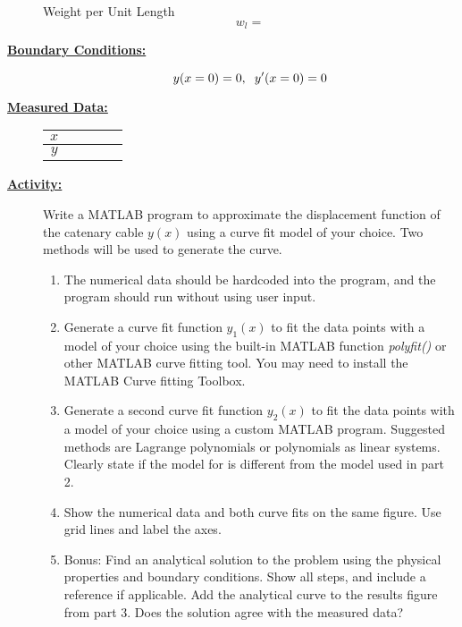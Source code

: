 \documentclass[12pt]{article}
\begin{document}
\begin{description}
  Weight per Unit Length
 	\[w_l = \]

  \item[\textbf{\underline{Boundary Conditions:}}] \hfill \vspace{0mm}
  
  \[y(x=0)=0, \hspace{2mm} y'(x=0)=0 \]


  \item[\textbf{\underline{Measured Data:}}] \hfill \vspace{0mm}
 
   \begin{tabular}{|c|c|c|c|c|} \hline
   $x$& & & &\\ \hline
   $y$& & & &\\ \hline 
   \end{tabular}


\newpage
\item[\textbf{\underline{Activity:}}] \hfill \vspace{0mm}

Write a MATLAB program to approximate the displacement function of the catenary cable $y(x)$ using a curve fit model of your choice. Two methods will be used to generate the curve.

\begin{enumerate}	
	
	\item The numerical data should be hardcoded into the program, and the program should run without using user input. 

	\item Generate a curve fit function $y_1(x)$ to fit the data points with a model of your choice using the built-in MATLAB function {\it polyfit()} or other MATLAB curve fitting tool. You may need to install the MATLAB Curve fitting Toolbox. 

	\item Generate a second curve fit function $y_2(x)$ to fit the data points with a model of your choice using a custom MATLAB program. Suggested methods are Lagrange polynomials or polynomials as linear systems. Clearly state if the model for is different from the model used in part 2.

	\item Show the numerical data and both curve fits on the same figure. Use grid lines and label the axes.

	\item Bonus: Find an analytical solution to the problem using the physical properties and boundary conditions. Show all steps, and include a reference if applicable. Add the analytical curve to the results figure from part 3. Does the solution agree with the measured data?


\end{enumerate}
\end{description}
\end{document}

